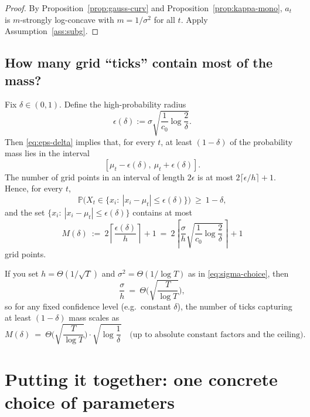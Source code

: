 \documentclass[11pt]{article}
\begin{document}
\begin{proof}
    By Proposition~\ref{prop:gauss-curv} and Proposition~\ref{prop:kappa-mono}, $a_t$ is $m$-strongly log-concave with $m=1/\sigma^2$ for all $t$. Apply Assumption~\ref{ass:subg}.
\end{proof}

\subsection{How many grid ``ticks'' contain most of the mass?}

Fix $\delta\in(0,1)$. Define the high-probability radius
\[
    \epsilon(\delta) := \sigma\sqrt{\frac{1}{c_0}\log\frac{2}{\delta}}.
\]
Then \eqref{eq:eps-delta} implies that, for every $t$, at least $(1-\delta)$ of the probability mass lies in the interval
\[
    [\mu_t-\epsilon(\delta),\ \mu_t+\epsilon(\delta)].
\]
The number of grid points in an interval of length $2\epsilon$ is at most $2\lceil \epsilon/h\rceil+1$.
Hence, for every $t$,
\begin{equation}\label{eq:ticks}
    \mathbb{P}\Big(X_t \in \{x_i:\ |x_i-\mu_t|\le \epsilon(\delta)\}\Big)\ \ge\ 1-\delta,
\end{equation}
and the set $\{x_i:\ |x_i-\mu_t|\le \epsilon(\delta)\}$ contains at most
\begin{equation}\label{eq:tickcount}
    M(\delta)\ :=\ 2\left\lceil \frac{\epsilon(\delta)}{h}\right\rceil + 1
    \ =\ 2\left\lceil \frac{\sigma}{h}\sqrt{\frac{1}{c_0}\log\frac{2}{\delta}}\right\rceil + 1
\end{equation}
grid points.

If you set $h=\Theta(1/\sqrt{T})$ and $\sigma^2=\Theta(1/\log T)$ as in \eqref{eq:sigma-choice}, then
\[
    \frac{\sigma}{h}\ =\ \Theta\!\Big(\sqrt{\frac{T}{\log T}}\Big),
\]
so for any fixed confidence level (e.g.\ constant $\delta$), the number of ticks capturing at least $(1-\delta)$ mass scales as
\[
    M(\delta)\ =\ \Theta\!\Big(\sqrt{\frac{T}{\log T}}\Big)\cdot \sqrt{\log\frac{1}{\delta}}
    \quad\text{(up to absolute constant factors and the ceiling)}.
\]

\section{Putting it together: one concrete choice of parameters}
\end{document}
